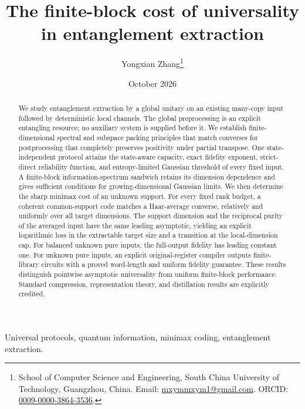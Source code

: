 \documentclass[12pt,journal,draftclsnofoot,onecolumn]{IEEEtran}
\title{The finite-block cost of universality\\in entanglement extraction}
\author{Yongxian Zhang\thanks{School of Computer Science and Engineering, South China University of Technology, Guangzhou, China. Email: \href{mailto:mxymmxym1@gmail.com}{mxymmxym1@gmail.com}. ORCID: \href{https://orcid.org/0009-0000-3864-3536}{0009-0000-3864-3536}.}}
\date{October 2026}
\theoremstyle{definition}\newtheorem{definition}[theorem]{Definition}
\theoremstyle{remark}\newtheorem{remark}[theorem]{Remark}
\begin{document}
\maketitle
\begin{abstract}
We study entanglement extraction by a global unitary on an existing many-copy input followed by deterministic local channels. The global preprocessing is an explicit entangling resource; no auxiliary system is supplied before it. We establish finite-dimensional spectral and subspace packing principles that match converses for postprocessing that completely preserves positivity under partial transpose. One state-independent protocol attains the state-aware capacity, exact fidelity exponent, strict-direct reliability function, and entropy-limited Gaussian threshold of every fixed input. A finite-block information-spectrum sandwich retains its dimension dependence and gives sufficient conditions for growing-dimensional Gaussian limits. We then determine the sharp minimax cost of an unknown support. For every fixed rank budget, a coherent common-support code matches a Haar-average converse, relatively and uniformly over all target dimensions. The support dimension and the reciprocal purity of the averaged input have the same leading asymptotic, yielding an explicit logarithmic loss in the extractable target size and a transition at the local-dimension cap. For balanced unknown pure inputs, the full-output fidelity has leading constant one. For unknown pure inputs, an explicit original-register compiler outputs finite-library circuits with a proved word-length and uniform fidelity guarantee. These results distinguish pointwise asymptotic universality from uniform finite-block performance. Standard compression, representation theory, and distillation results are explicitly credited.
\end{abstract}
\begin{IEEEkeywords}
Universal protocols, quantum information, minimax coding, entanglement extraction.
\end{IEEEkeywords}








\end{document}
